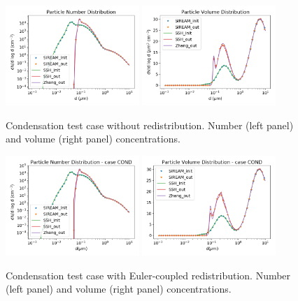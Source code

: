 \documentclass[a4paper,11pt]{article}
\begin{document}
\begin{figure}[H]
        \begin{center}
                \includegraphics[angle=0,width=0.45\textwidth]{../graph/figure_ref/dNdlogd_COND_no_redist.png}
                \includegraphics[angle=0,width=0.45\textwidth]{../graph/figure_ref/dVdlogd_COND_no_redist.png}
        \end{center}
\caption{Condensation test case without redistribution. Number (left panel) and volume (right panel) concentrations.}
\label{fig-cond-noredist}
\end{figure}
       
\begin{figure}[H]
        \begin{center}
                \includegraphics[angle=0,width=0.45\textwidth]{../graph/figure_ref/dNdlogd_COND_r12.png}
                \includegraphics[angle=0,width=0.45\textwidth]{../graph/figure_ref/dVdlogd_COND_r12.png}
        \end{center}
\caption{Condensation test case with Euler-coupled redistribution. Number (left panel) and volume (right panel) concentrations.}
\label{fig-cond-redist}
\end{figure}
       
\end{document}
